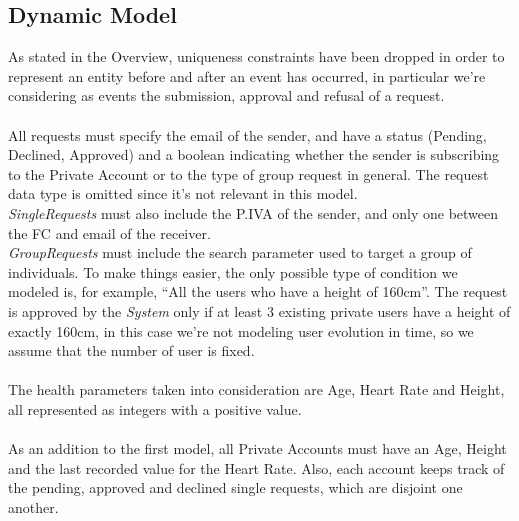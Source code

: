 \documentclass[titlepage]{article}
\begin{document}
		\subsection{Dynamic Model}
		As stated in the Overview, uniqueness constraints have been dropped in order to represent an entity before and 		after an event has occurred, in particular we’re considering as events the submission, approval and refusal of a 		request.\\
		\\
		All requests must specify the email of the sender, and have a status (Pending, Declined, Approved) and a boolean 		indicating whether the sender is subscribing to the Private Account or to the type of group request in general. The 		request data type is omitted since it’s not relevant in this model.\\
		{\it SingleRequests} must also include the P.IVA of the sender, and only one between the FC and email of the 			receiver.\\
		{\it GroupRequests} must include the search parameter used to target a group of individuals. To make things easier, 		the only possible type of condition we modeled is, for example, “All the users who have a height of 160cm”. The 		request is approved by the {\it System} only if at least 3 existing private users have a height of exactly 160cm, in this 		case we’re not modeling user evolution in time, so we assume that the number of user is fixed.\\
		\\
		The health parameters taken into consideration are Age, Heart Rate and Height, all represented as integers with a 		positive value.\\
		\\
		As an addition to the first model, all Private Accounts must have an Age, Height and the last recorded value for the 		Heart Rate. Also, each account keeps track of the pending, approved and declined single requests, which are 			disjoint one another.\\	
\end{document}
